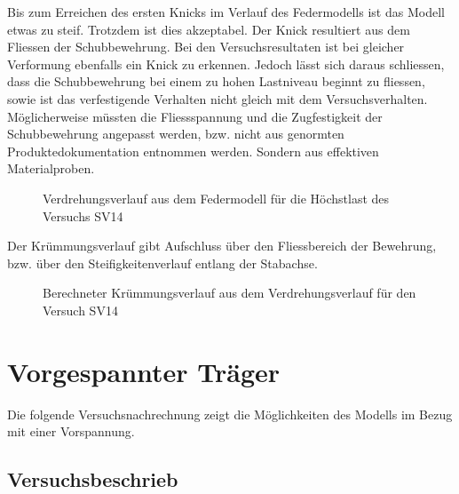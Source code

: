 \documentclass[
  11pt,
  letterpaper,
]{scrreprt}
\begin{document}
Bis zum Erreichen des ersten Knicks im Verlauf des Federmodells ist das
Modell etwas zu steif. Trotzdem ist dies akzeptabel. Der Knick
resultiert aus dem Fliessen der Schubbewehrung. Bei den
Versuchsresultaten ist bei gleicher Verformung ebenfalls ein Knick zu
erkennen. Jedoch lässt sich daraus schliessen, dass die Schubbewehrung
bei einem zu hohen Lastniveau beginnt zu fliessen, sowie ist das
verfestigende Verhalten nicht gleich mit dem Versuchsverhalten.
Möglicherweise müssten die Fliessspannung und die Zugfestigkeit der
Schubbewehrung angepasst werden, bzw. nicht aus genormten
Produktedokumentation entnommen werden. Sondern aus effektiven
Materialproben.

\begin{figure}[H]


\caption{\label{fig-phi-max-sv14}Verdrehungsverlauf aus dem Federmodell
für die Höchstlast des Versuchs SV14}

\end{figure}%

Der Krümmungsverlauf gibt Aufschluss über den Fliessbereich der
Bewehrung, bzw. über den Steifigkeitenverlauf entlang der Stabachse.

\begin{figure}[H]


\caption{\label{fig-chi-max-sv14}Berechneter Krümmungsverlauf aus dem
Verdrehungsverlauf für den Versuch SV14}

\end{figure}%


\chapter{Vorgespannter Träger}\label{vorgespannter-truxe4ger}

Die folgende Versuchsnachrechnung zeigt die Möglichkeiten des Modells im
Bezug mit einer Vorspannung.

\section{Versuchsbeschrieb}\label{versuchsbeschrieb}
\end{document}
